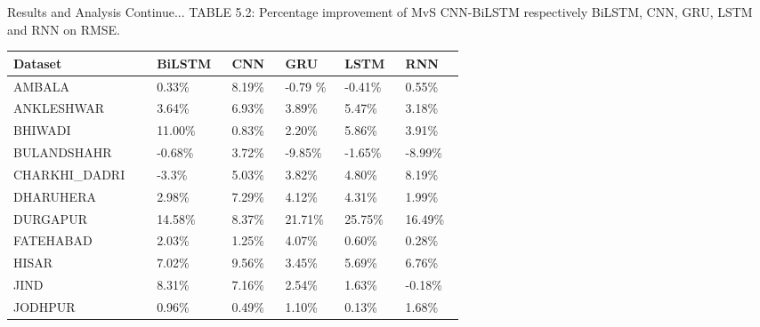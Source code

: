 \documentclass[12pt, aspectratio=169]{beamer}
\begin{document}
\begin{frame}{Results and Analysis \tiny{Continue...}}
	\centering
	\scriptsize{TABLE 5.2: Percentage improvement of MvS CNN-BiLSTM respectively BiLSTM,  CNN,  GRU,  LSTM and RNN on RMSE.}
	\begin{table}
        \begin{tabular}{ |p{0.19\linewidth} |p{0.08\linewidth} |p{0.08\linewidth} |p{0.08\linewidth} | p{0.08\linewidth} |p{0.08\linewidth}|}%
		\hline \scriptsize Dataset        & \scriptsize   BiLSTM & \scriptsize   CNN & \scriptsize  GRU & \scriptsize   LSTM & \scriptsize   RNN \\ \hline
       \scriptsize AMBALA & \scriptsize 0.33\% & \scriptsize 8.19\% & \scriptsize -0.79 \% & \scriptsize -0.41\% & \scriptsize 0.55\% \\ \hline
       \scriptsize ANKLESHWAR & \scriptsize 3.64\% & \scriptsize 6.93\% & \scriptsize 3.89\% & \scriptsize 5.47\% & \scriptsize 3.18\% \\ \hline
       \scriptsize BHIWADI & \scriptsize 11.00\% & \scriptsize 0.83\% & \scriptsize 2.20\% & \scriptsize 5.86\% & \scriptsize 3.91\% \\ \hline
       \scriptsize BULANDSHAHR & \scriptsize -0.68\% & \scriptsize 3.72\% & \scriptsize -9.85\% & \scriptsize -1.65\% & \scriptsize  -8.99\% \\ \hline
       \scriptsize CHARKHI\_DADRI & \scriptsize -3.3\% & \scriptsize  5.03\% & \scriptsize  3.82\% & \scriptsize  4.80\% & \scriptsize  8.19\% \\ \hline
       \scriptsize DHARUHERA & \scriptsize  2.98\% & \scriptsize  7.29\% & \scriptsize  4.12\% & \scriptsize  4.31\% & \scriptsize  1.99\% \\ \hline
       \scriptsize DURGAPUR & \scriptsize  14.58\% & \scriptsize  8.37\% & \scriptsize  21.71\% & \scriptsize  25.75\% & \scriptsize  16.49\% \\ \hline
       \scriptsize FATEHABAD & \scriptsize  2.03\% & \scriptsize  1.25\% & \scriptsize  4.07\% & \scriptsize  0.60\% & \scriptsize  0.28\% \\ \hline
       \scriptsize HISAR & \scriptsize  7.02\% & \scriptsize  9.56\% & \scriptsize  3.45\% & \scriptsize  5.69\% & \scriptsize  6.76\% \\ \hline
       \scriptsize JIND & \scriptsize  8.31\% & \scriptsize  7.16\% & \scriptsize  2.54\% & \scriptsize  1.63\% & \scriptsize  -0.18\% \\ \hline
       \scriptsize JODHPUR & \scriptsize  0.96\% & \scriptsize  0.49\% & \scriptsize  1.10\% & \scriptsize  0.13\% & \scriptsize  1.68\% \\ \hline

\end{tabular}
\end{table}
\end{frame}
\end{document}
